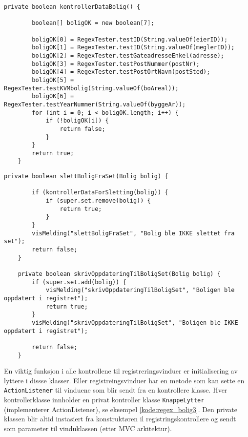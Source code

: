 \begin{lstlisting}[caption=\texttt{ControllerRegistrerBolig.java}: Regex test av generelle tekstfelt for bolig.,label=kode:regex_bolig]
    private boolean kontrollerDataBolig() {
    
        boolean[] boligOK = new boolean[7];

        boligOK[0] = RegexTester.testID(String.valueOf(eierID));
        boligOK[1] = RegexTester.testID(String.valueOf(meglerID));
        boligOK[2] = RegexTester.testGateadresseEnkel(adresse);
        boligOK[3] = RegexTester.testPostNummer(postNr);
        boligOK[4] = RegexTester.testPostOrtNavn(postSted);
        boligOK[5] = RegexTester.testKVMbolig(String.valueOf(boAreal));
        boligOK[6] = RegexTester.testYearNummer(String.valueOf(byggeAr));
        for (int i = 0; i < boligOK.length; i++) {
            if (!boligOK[i]) {
                return false;
            }
        }
        return true;
    }
\end{lstlisting}


\begin{lstlisting}[caption=\texttt{ControllerRegistrerBolig.java}: Sletting og oppdatering av samme bolig objekt via superklassen til kontrolleren.,label=kode:regex_bolig2]
    private boolean slettBoligFraSet(Bolig bolig) {

        if (kontrollerDataForSletting(bolig)) {
            if (super.set.remove(bolig)) {
                return true;
            }
        }
        visMelding("slettBoligFraSet", "Bolig ble IKKE slettet fra set");
        return false;
    }
    
    private boolean skrivOppdateringTilBoligSet(Bolig bolig) {
        if (super.set.add(bolig)) {
            visMelding("skrivOppdateringTilBoligSet", "Boligen ble oppdatert i registret");
            return true;
        }
        visMelding("skrivOppdateringTilBoligSet", "Boligen ble IKKE oppdatert i registret");

        return false;
    }
\end{lstlisting}

En viktig funksjon i alle kontrollene til registreringsvinduer er initialisering av lyttere i dissse klasser. Eller registreingsvinduer har en metode som kan sette en \texttt{ActionListener} til vinduene som blir sendt fra en kontrollere klasse. Hver kontrollerklasse innholder en privat kontroller klasse \texttt{KnappeLytter} (implementerer ActionListener), se eksempel \ref{kode:regex_bolig3}. Den private klassen blir altid instasiert fra konstruktøren il registringskontrollere og sendt som parameter til vinduklassen (etter MVC arkitektur).

